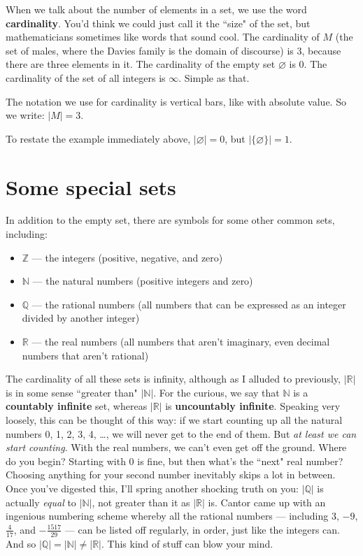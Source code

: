 When we talk about the number of elements in a set, we use the word
\textbf{cardinality}. You'd think we could just call it the ``size" of the
set, but mathematicians sometimes like words that sound cool. The
cardinality of $M$ (the set of males, where the Davies family is the domain
of discourse) is 3, because there are three elements in it. The cardinality
of the empty set  $\varnothing$ is 0. The cardinality of
the set of all integers is $\infty$.  Simple as that.

The notation we use for cardinality is vertical bars, like with absolute
value. So we write: $|M| = 3$.

To restate the example immediately above, $|\varnothing| = 0$, but
$|\{\varnothing\}| = 1$.


\section{Some special sets}

In addition to the empty set, there are symbols for some other common sets,
including:

\begin{itemize}
\item $\mathbb{Z}$ ---  the integers (positive, negative, and zero)
\item $\mathbb{N}$ ---  the natural numbers (positive integers and zero)
\item $\mathbb{Q}$ ---  the rational numbers (all numbers that can be
expressed as an integer divided by another integer)
\item $\mathbb{R}$ ---  the real numbers
(all numbers that aren't imaginary, 
even decimal numbers that aren't rational) 
\end{itemize}

The cardinality of all these sets is infinity,  although as I alluded to
previously, $|\mathbb{R}|$ is in some sense ``greater than" $|\mathbb{N}|$.
For the curious, we say that $\mathbb{N}$ is a \textbf{countably infinite} set, whereas $|\mathbb{R}|$ is \textbf{uncountably infinite}. Speaking very
loosely, this can be thought of this way: if we start counting up all the
natural numbers 0, 1, 2, 3, 4, \dots, we will never get to the end of them.
But \textit{at least we can start counting}. With the real numbers, we
can't even get off the ground. Where do you begin? Starting with 0 is fine,
but then what's the ``next" real number? Choosing anything for your second
number inevitably skips a lot in between. Once you've digested this, I'll
spring another shocking truth on you: $|\mathbb{Q}|$ is actually
\textit{equal} to
$|\mathbb{N}|$, not greater than it as $|\mathbb{R}|$ is. Cantor came up
with an ingenious numbering scheme whereby all the rational numbers ---
including 3, $-9$, $\frac{4}{17}$, and $-\frac{1517}{29}$ --- can be listed
off regularly, in order, just like the integers can. And so
$|\mathbb{Q}|=|\mathbb{N}|\neq|\mathbb{R}|$. This kind of stuff can
blow your mind.


